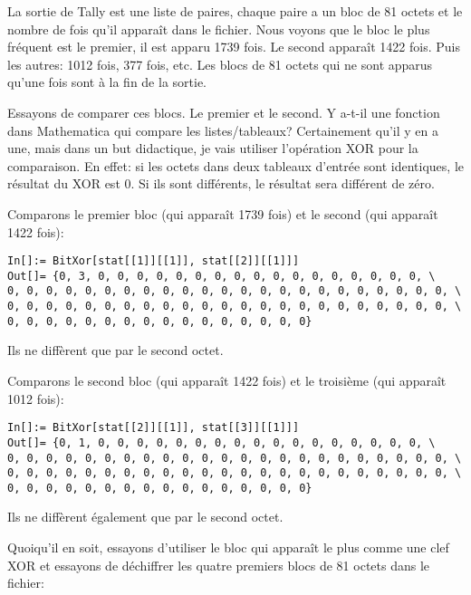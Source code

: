 La sortie de Tally est une liste de paires, chaque paire a un bloc de 81 octets et
le nombre de fois qu'il apparaît dans le fichier.
Nous voyons que le bloc le plus fréquent est le premier, il est apparu 1739 fois.
Le second apparaît 1422 fois. Puis les autres: 1012 fois, 377 fois, etc.
Les blocs de 81 octets qui ne sont apparus qu'une fois sont à la fin de la sortie.

Essayons de comparer ces blocs. Le premier et le second.
Y a-t-il une fonction dans Mathematica qui compare les listes/tableaux?
Certainement qu'il y en a une, mais dans un but didactique, je vais utiliser
l'opération XOR pour la comparaison.
En effet: si les octets dans deux tableaux d'entrée sont identiques, le résultat
du XOR est 0. Si ils sont différents, le résultat sera différent de zéro.

Comparons le premier bloc (qui apparaît 1739 fois) et le second (qui apparaît 1422 fois):

\begin{lstlisting}[style=custommath]
In[]:= BitXor[stat[[1]][[1]], stat[[2]][[1]]]
Out[]= {0, 3, 0, 0, 0, 0, 0, 0, 0, 0, 0, 0, 0, 0, 0, 0, 0, 0, 0, \
0, 0, 0, 0, 0, 0, 0, 0, 0, 0, 0, 0, 0, 0, 0, 0, 0, 0, 0, 0, 0, 0, 0, \
0, 0, 0, 0, 0, 0, 0, 0, 0, 0, 0, 0, 0, 0, 0, 0, 0, 0, 0, 0, 0, 0, 0, \
0, 0, 0, 0, 0, 0, 0, 0, 0, 0, 0, 0, 0, 0, 0, 0}
\end{lstlisting}

Ils ne diffèrent que par le second octet.

Comparons le second bloc (qui apparaît 1422 fois) et le troisième (qui apparaît 1012 fois):

\begin{lstlisting}[style=custommath]
In[]:= BitXor[stat[[2]][[1]], stat[[3]][[1]]]
Out[]= {0, 1, 0, 0, 0, 0, 0, 0, 0, 0, 0, 0, 0, 0, 0, 0, 0, 0, 0, \
0, 0, 0, 0, 0, 0, 0, 0, 0, 0, 0, 0, 0, 0, 0, 0, 0, 0, 0, 0, 0, 0, 0, \
0, 0, 0, 0, 0, 0, 0, 0, 0, 0, 0, 0, 0, 0, 0, 0, 0, 0, 0, 0, 0, 0, 0, \
0, 0, 0, 0, 0, 0, 0, 0, 0, 0, 0, 0, 0, 0, 0, 0}
\end{lstlisting}

Ils ne diffèrent également que par le second octet.

Quoiqu'il en soit, essayons d'utiliser le bloc qui apparaît le plus comme une clef
XOR et essayons de déchiffrer les quatre premiers blocs de 81 octets dans le fichier:

